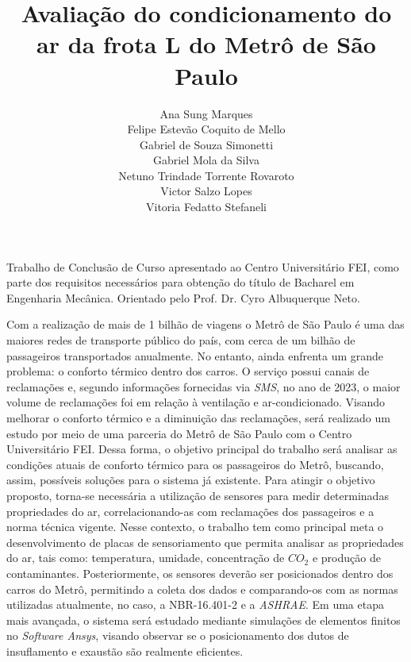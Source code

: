 \documentclass[acronym,symbols,table]{fei}
\title{Avaliação do condicionamento do ar da frota L do Metrô de São Paulo}
\author{Ana Sung Marques \\Felipe Estevão Coquito de Mello\\  Gabriel de Souza Simonetti  \\ Gabriel Mola da Silva \\ Netuno Trindade Torrente Rovaroto \\ Victor Salzo Lopes  \\ Vitoria Fedatto Stefaneli}
\begin{document}
\maketitle

\begin{folhaderosto}
	Trabalho de Conclusão de Curso apresentado ao Centro Universitário FEI, como parte dos requisitos necessários para obtenção do título de Bacharel em Engenharia Mecânica. Orientado pelo Prof. Dr. Cyro Albuquerque Neto.
\end{folhaderosto}



\begin{resumo} %

Com a realização de mais de 1 bilhão de viagens o Metrô de São Paulo é uma das maiores redes de transporte público do país, com cerca de um bilhão de passageiros transportados anualmente. No entanto, ainda enfrenta um grande problema: o conforto térmico dentro dos carros. O serviço possui canais de reclamações e, segundo informações fornecidas via \textit{SMS}, no ano de 2023, o maior volume de reclamações foi em relação à ventilação e ar-condicionado. Visando melhorar o conforto térmico e a diminuição das reclamações, será realizado um estudo por meio de uma parceria do Metrô de São Paulo com o Centro Universitário FEI. Dessa forma, o objetivo principal do trabalho será analisar as condições atuais de conforto térmico para os passageiros do Metrô, buscando, assim, possíveis soluções para o sistema já existente. Para atingir o objetivo proposto, torna-se necessária a utilização de sensores para medir determinadas propriedades do ar, correlacionando-as com reclamações dos passageiros e a norma técnica vigente. Nesse contexto, o trabalho tem como principal meta o desenvolvimento de placas de sensoriamento que permita analisar as propriedades do ar, tais como: temperatura, umidade, concentração de $CO_2$ e produção de contaminantes. Posteriormente, os sensores deverão ser posicionados dentro dos carros do Metrô, permitindo a coleta dos dados e comparando-os com as normas utilizadas atualmente, no caso, a NBR-16.401-2 e a \textit{ASHRAE}. Em uma etapa mais avançada, o sistema será estudado mediante simulações de elementos finitos no \textit{Software Ansys}, visando observar se o posicionamento dos dutos de insuflamento e exaustão são realmente eficientes. 


\end{resumo}
\end{document}
